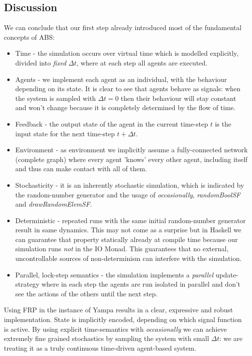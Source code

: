 \subsection{Discussion}
We can conclude that our first step already introduced most of the fundamental concepts of ABS:
\begin{itemize}
	\item Time - the simulation occurs over virtual time which is modelled explicitly, divided into \textit{fixed} $\Delta t$, where at each step all agents are executed.
	\item Agents - we implement each agent as an individual, with the behaviour depending on its state. It is clear to see that agents behave as signals: when the system is sampled with $\Delta t = 0$ then their behaviour will stay constant and won't change because it is completely determined by the flow of time. 
	\item Feedback - the output state of the agent in the current time-step $t$ is the input state for the next time-step $t + \Delta t$.
	\item Environment - as environment we implicitly assume a fully-connected network (complete graph) where every agent 'knows' every other agent, including itself and thus can make contact with all of them.
	\item Stochasticity - it is an inherently stochastic simulation, which is indicated by the random-number generator and the usage of \textit{occasionally}, \textit{randomBoolSF} and \textit{drawRandomElemSF}.
	\item Deterministic - repeated runs with the same initial random-number generator result in same dynamics. This may not come as a surprise but in Haskell we can guarantee that property statically already at compile time because our simulation runs \textit{not} in the IO Monad. This guarantees that no external, uncontrollable sources of non-determinism can interfere with the simulation.
	\item Parallel, lock-step semantics - the simulation implements a \textit{parallel} update-strategy where in each step the agents are run isolated in parallel and don't see the actions of the others until the next step.
\end{itemize}

Using FRP in the instance of Yampa results in a clear, expressive and robust implementation. State is implicitly encoded, depending on which signal function is active. By using explicit time-semantics with \textit{occasionally} we can achieve extremely fine grained stochastics by sampling the system with small $\Delta t$: we are treating it as a truly continuous time-driven agent-based system.

